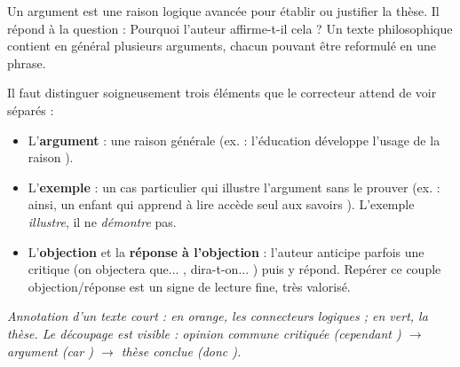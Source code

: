 \documentclass[11pt]{article}
\newcommand{\cle}[1]{{\popxbold\color{popdark}#1}}
\begin{document}
\begin{definition}[L'argument]
Un \cle{argument} est une raison logique avanc\'ee pour \'etablir ou justifier la th\`ese. Il r\'epond \`a la question : \og Pourquoi l'auteur affirme-t-il cela ? \fg Un texte philosophique contient en g\'en\'eral plusieurs arguments, chacun pouvant \^etre reformul\'e en une phrase.
\end{definition}

Il faut distinguer soigneusement trois \'el\'ements que le correcteur attend de voir s\'epar\'es :

\begin{itemize}
\item L'\textbf{argument} : une raison g\'en\'erale (ex. : \og l'\'education d\'eveloppe l'usage de la raison \fg{}).
\item L'\textbf{exemple} : un cas particulier qui illustre l'argument sans le prouver (ex. : \og ainsi, un enfant qui apprend \`a lire acc\`ede seul aux savoirs \fg{}). L'exemple \emph{illustre}, il ne \emph{d\'emontre} pas.
\item L'\textbf{objection} et la \textbf{r\'eponse \`a l'objection} : l'auteur anticipe parfois une critique (\og on objectera que... \fg{}, \og dira-t-on... \fg{}) puis y r\'epond. Rep\'erer ce couple objection/r\'eponse est un signe de lecture fine, tr\`es valoris\'e.
\end{itemize}

\begin{exemplebox}
\begin{center}
\par\smallskip
\textit{Annotation d'un texte court : en orange, les connecteurs logiques ; en vert, la th\`ese. Le d\'ecoupage est visible : opinion commune critiqu\'ee (\og cependant \fg{}) $\rightarrow$ argument (\og car \fg{}) $\rightarrow$ th\`ese conclue (\og donc \fg{}).}
\end{center}
\end{exemplebox}
\end{document}
